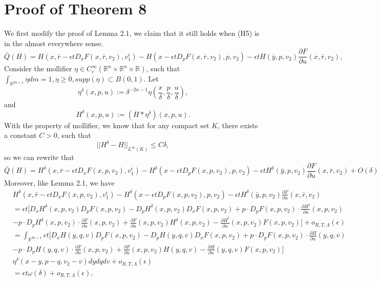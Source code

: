 \documentclass[preprint]{elsarticle}
\numberwithin{equation}{section}
\begin{document}
\section{Proof of Theorem 8}
We first modify the proof of Lemma 2.1, we claim that it still holds when (H5) is in the almost everywhere sense.
\begin{equation}
        \bar Q(H)=H(x,\bar r-\epsilon tD_xF(x,\bar r,v_2),v^{\epsilon}_1)-H(x-\epsilon tD_pF(x,\bar r,v_2),p,v_2)-\epsilon tH(\bar y,p,v_2)\frac{\partial F}{\partial u}(x,\bar r,v_2),
 \end{equation}
 Consider the mollifier $\eta \in C^\infty_c (\mathbb R^n \times \mathbb R^n \times \mathbb R)$, such that $\int_{\mathbb R^{2n+1}} \eta dm=1, \eta \geq 0,supp(\eta) \subset B(0,1)$. Let
 \begin{equation}
     \eta^\delta(x,p,u):=\delta^{-2n-1}\eta(\frac{x}{\delta},\frac{p}{\delta},\frac{u}{\delta}),
 \end{equation}
 and 
 \begin{equation}
     H^\delta(x,p,u):=(H*\eta^\delta)(x,p,u).
 \end{equation}
With the property of mollifier, we know that for any compact set $K$, there exists a constant $C>0$, such that
\begin{equation}
    ||H^\delta-H||_{L^\infty(K)}\leq C\delta,
\end{equation}
so we can rewrite that
\begin{equation}
    \bar Q(H)=H^\delta(x,\bar r-\epsilon tD_xF(x,p,v_2),v^{\epsilon}_1)-H^\delta(x-\epsilon tD_pF(x,p,v_2),p,v_2)-\epsilon tH^\delta(\bar y,p,v_2)\frac{\partial F}{\partial u}(x,\bar r,v_2)+O(\delta)
\end{equation}
Moreover, like Lemma 2.1, we have
\begin{align*}
    &H^\delta(x,\bar r-\epsilon tD_xF(x,p,v_2),v^{\epsilon}_1)-H^\delta(x-\epsilon tD_pF(x,p,v_2),p,v_2)-\epsilon tH^\delta(\bar y,p,v_2)\frac{\partial F}{\partial u}(x,\bar r,v_2)\\
    &=\epsilon t[D_x H^\delta(x,p,v_2) D_pF(x,p,v_2)- D_p H^\delta(x,p,v_2) D_xF(x,p,v_2) + p \cdot D_pF(x,p,v_2) \cdot \frac{\partial H^\delta}{\partial u}(x,p,v_2) \\
    & - p \cdot D_pH^\delta(x,p,v_2) \cdot \frac{\partial F}{\partial u}(x,p,v_2) + \frac{\partial F}{\partial u}(x,p,v_2) H^\delta(x,p,v_2)-\frac{\partial H^\delta}{\partial u}(x,p,v_2) F(x,p,v_2)]+o_{R,T,\Lambda}(\epsilon)\\
    &=\int _{\mathbb R^{2n+1}}\epsilon t[D_x H(y,q,v) D_pF(x,p,v_2)- D_p H(y,q,v) D_xF(x,p,v_2) + p \cdot D_pF(x,p,v_2) \cdot \frac{\partial H}{\partial u}(y,q,v) \\
    & - p \cdot D_pH(y,q,v) \cdot \frac{\partial F}{\partial u}(x,p,v_2) + \frac{\partial F}{\partial u}(x,p,v_2) H(y,q,v)-\frac{\partial H}{\partial u}(y,q,v) F(x,p,v_2)]\\
    &\eta ^\delta(x-y,p-q,v_2-v)dydqdv+o_{R,T,\Lambda}(\epsilon)\\
    &=\epsilon t \omega(\delta)+o_{R,T,\Lambda}(\epsilon),
\end{align*}
\end{document}
